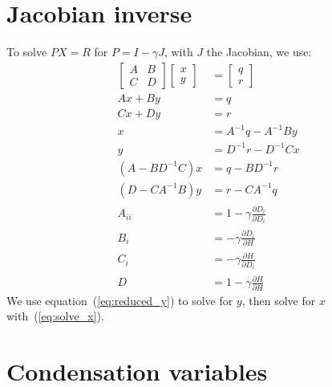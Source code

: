 \documentclass{article}
\begin{document}
\newpage

\section{Jacobian inverse}

To solve $P X = R$ for $P = I - \gamma J$, with $J$ the Jacobian, we use:
\begin{align}
  \begin{bmatrix} A & B \\ C & D \end{bmatrix}
  \begin{bmatrix} x \\ y \end{bmatrix}
  &=
  \begin{bmatrix} q \\ r \end{bmatrix} \\
  A x + B y &= q \\
  C x + D y &= r \\
  x &= A^{-1} q - A^{-1} B y \label{eq:solve_x} \\
  y &= D^{-1} r - D^{-1} C x \label{eq:solve_y} \\
  (A - B D^{-1} C) x &= q - B D^{-1} r \label{eq:reduced_x} \\
  (D - C A^{-1} B) y &= r - C A^{-1} q \label{eq:reduced_y} \\
  A_{ii} &= 1 - \gamma \frac{\partial \dot{D}_i}{\partial D_i} \\
  B_i &= - \gamma \frac{\partial \dot{D}_i}{\partial H} \\
  C_i &= - \gamma \frac{\partial \dot{H}}{\partial D_i} \\
  D &= 1 - \gamma \frac{\partial \dot{H}}{\partial H}
\end{align}
We use equation~(\ref{eq:reduced_y}) to solve for $y$, then solve for
$x$ with~(\ref{eq:solve_x}).

\newpage

\section{Condensation variables}
\end{document}
